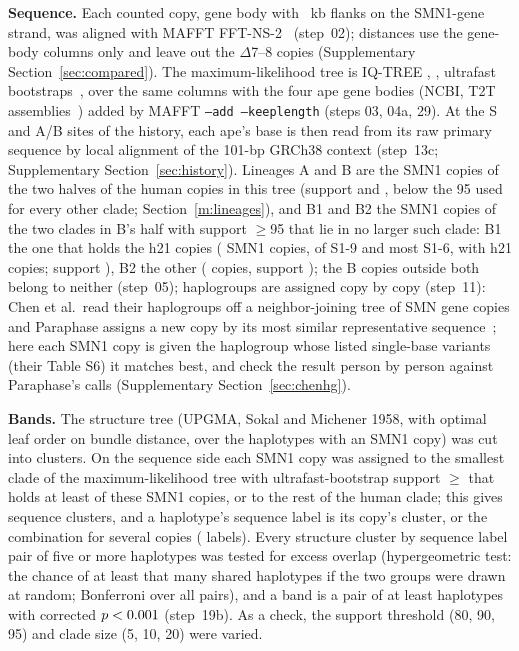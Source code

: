 \documentclass[10pt]{article}
\begin{document}
\textbf{Sequence.} Each counted copy, gene body with \setFlankKb~kb flanks on the SMN1-gene strand, was aligned with MAFFT
\verMafft{} FFT-NS-2~\cite{katoh2013} (step~02); distances use the \nGeneCols{} gene-body columns only and leave out
the \nDelLeftOut{} $\Delta$7--8 copies (Supplementary Section~\ref{sec:compared}). The
maximum-likelihood tree is IQ-TREE \verIqtree{}, \iqModel, \iqBoot{} ultrafast bootstraps~\cite{minh2020,hoang2018},
over the same columns with the four ape gene bodies (NCBI, T2T assemblies~\cite{yoo2025}) added by MAFFT
\texttt{--add --keeplength} (steps 03, 04a, 29). At the S and A/B sites of the history, each ape's base is then read from its raw primary sequence by local alignment of the 101-bp GRCh38 context (step~13c; Supplementary Section~\ref{sec:history}). Lineages A and B are the SMN1 copies of the two halves of the human
copies in this tree (support \mlIIsup{} and \mlIsup, below the 95 used for every other clade; Section~\ref{m:lineages}), and B1 and B2 the SMN1 copies of the two clades in B's half with support $\ge$95 that lie in no larger such clade: B1 the one that holds the h21 copies (\linBone{} SMN1 copies, of S1-9 and most S1-6, with \mlBhH{} h21 copies; support \mlBhSup), B2 the other (\linBtwo{} copies, support \mlEightSup); the \linBnone{} B copies outside both belong to neither (step~05); haplogroups are assigned copy by copy
(step~11): Chen et al.\ read their haplogroups off a neighbor-joining tree of SMN gene copies and Paraphase assigns a
new copy by its most similar representative sequence~\cite{chen2023}; here each SMN1 copy is given the haplogroup whose
listed single-base variants (their Table S6) it matches best, and check the result person by person against Paraphase's
calls (Supplementary Section~\ref{sec:chenhg}).

\textbf{Bands.} The structure tree (UPGMA, Sokal and Michener 1958, with optimal leaf order on bundle distance, over the \mlbHaps{} haplotypes
with an SMN1 copy) was cut into \setK{} clusters. On the sequence side each SMN1 copy was assigned to the smallest clade
of the maximum-likelihood tree with ultrafast-bootstrap support $\ge$\setMLsup{} that holds at least \setMLmin{} of
these SMN1 copies, or to the rest of the human clade; this gives \mlbClusters{} sequence clusters, and a haplotype's
sequence label is its copy's cluster, or the combination for several copies (\mlbLabels{} labels). Every structure
cluster by sequence label pair of five or more haplotypes was tested for excess overlap (hypergeometric test: the chance of at least that many shared haplotypes if the two groups were drawn at random; Bonferroni
over all pairs), and a band is a pair of at least \setMinOverlap{} haplotypes with corrected $p<0.001$ (step~19b).
As a check, the support threshold (80, 90, 95) and clade size (5, 10, 20) were varied.
\end{document}
